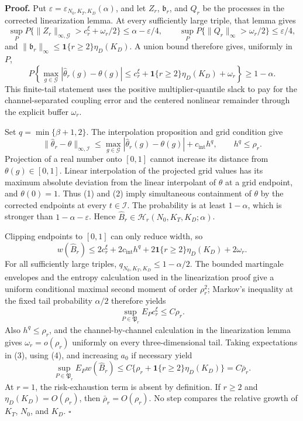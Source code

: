 \textbf{Proof.}
Put \(\varepsilon=\varepsilon_{N_0,K_T,K_D}(\alpha)\), and let \(Z_r\), \(\mathfrak b_r\), and \(Q_r\) be the processes in the corrected linearization lemma. At every sufficiently large triple, that lemma gives
\[
 \sup_P P\{\|Z_r\|_{\infty,\mathcal G}>c_r^\xi+\omega_r/2\}
 \le\alpha-\varepsilon/4,
 \qquad
 \sup_P P\{\|Q_r\|_\infty>\omega_r/2\}\le\varepsilon/4,
\]
and \(\|\mathfrak b_r\|_\infty\le\mathbf 1\{r\ge2\}\eta_D(K_D)\). A union bound therefore gives, uniformly in \(P\),
\[
 P\!\left\{
 \max_{g\in\mathcal G}|\widehat\theta_r(g)-\theta(g)|
 \le c_r^\xi+\mathbf 1\{r\ge2\}\eta_D(K_D)+\omega_r
 \right\}\ge1-\alpha. \tag{1}
\]
This finite-tail statement uses the positive multiplier-quantile slack to pay for the channel-separated coupling error and the centered nonlinear remainder through the explicit buffer \(\omega_r\).

Set \(q=\min\{\beta+1,2\}\). The interpolation proposition and grid condition give
\[
 \|\widehat\theta_r-\theta\|_{\infty,\mathcal I}
 \le\max_{g\in\mathcal G}|\widehat\theta_r(g)-\theta(g)|+c_{\mathrm{int}}h^q,
 \qquad h^q\le\rho_r. \tag{2}
\]
Projection of a real number onto \([0,1]\) cannot increase its distance from \(\theta(g)\in[0,1]\). Linear interpolation of the projected grid values has its maximum absolute deviation from the linear interpolant of \(\theta\) at a grid endpoint, and \(\theta(0)=1\). Thus (1) and (2) imply simultaneous containment of \(\theta\) by the corrected endpoints at every \(t\in\mathcal I\). The probability is at least \(1-\alpha\), which is stronger than \(1-\alpha-\varepsilon\). Hence \(\widehat B_r\in\mathcal H_r(N_0,K_T,K_D;\alpha)\).

Clipping endpoints to \([0,1]\) can only reduce width, so
\[
 w(\widehat B_r)
 \le2c_r^\xi+2c_{\mathrm{int}}h^q
 +2\mathbf 1\{r\ge2\}\eta_D(K_D)+2\omega_r. \tag{3}
\]
For all sufficiently large triples, \(q_{N_0,K_T,K_D}\le1-\alpha/2\). The bounded martingale envelopes and the entropy calculation used in the linearization proof give a uniform conditional maximal second moment of order \(\rho_r^2\); Markov's inequality at the fixed tail probability \(\alpha/2\) therefore yields
\[
 \sup_{P\in\mathfrak P_r}E_Pc_r^\xi\le C\rho_r. \tag{4}
\]
Also \(h^q\le\rho_r\), and the channel-by-channel calculation in the linearization lemma gives \(\omega_r=o(\rho_r)\) uniformly on every three-dimensional tail. Taking expectations in (3), using (4), and increasing \(a_0\) if necessary yield
\[
 \sup_{P\in\mathfrak P_r}E_Pw(\widehat B_r)
 \le C\{\rho_r+\mathbf 1\{r\ge2\}\eta_D(K_D)\}
 =C\bar\rho_r. \tag{5}
\]
At \(r=1\), the risk-exhaustion term is absent by definition. If \(r\ge2\) and \(\eta_D(K_D)=O(\rho_r)\), then \(\bar\rho_r=O(\rho_r)\). No step compares the relative growth of \(K_T\), \(N_0\), and \(K_D\). \(\square\)